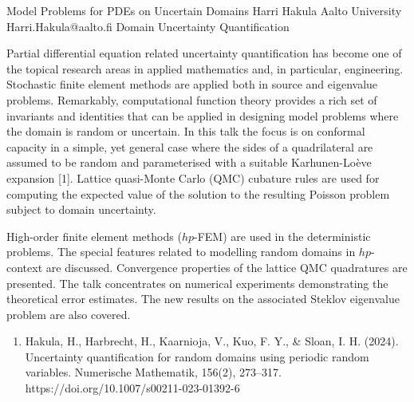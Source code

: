 \begin{talk}
  {Model Problems for PDEs on Uncertain Domains}%
  {Harri Hakula}%
  {Aalto University}%
  {Harri.Hakula@aalto.fi}%
  {}%
  {Domain Uncertainty Quantification}%
    
   
Partial differential equation related uncertainty quantification has become one of the
topical research areas in applied mathematics and, in particular, engineering.
Stochastic finite element methods are applied both in source and eigenvalue problems.
Remarkably, computational function theory provides a rich set of invariants 
and identities that
can be applied in designing model problems where the domain is random or uncertain. 
In this talk the focus is on conformal capacity in a simple, 
yet general case where the sides of a quadrilateral are assumed to be random 
and parameterised with a suitable Karhunen-Lo\`eve expansion [1].
Lattice quasi-Monte Carlo (QMC) cubature rules are used for computing the expected value of the solution to the resulting Poisson problem subject to domain uncertainty. 

High-order finite element methods ($hp$-FEM) are used in the deterministic problems.
The special features related to modelling random domains in $hp$-context are discussed.
Convergence properties of the lattice QMC quadratures are presented. The talk
concentrates on numerical experiments demonstrating the theoretical error estimates.
The new results on the associated Steklov eigenvalue problem are also covered.


\medskip

\begin{enumerate}
 \item[{[1]}] Hakula, H., Harbrecht, H., Kaarnioja, V., Kuo, F. Y., \& Sloan, I. H. (2024). Uncertainty quantification for random domains using periodic random variables. Numerische Mathematik, 156(2), 273--317. https://doi.org/10.1007/s00211-023-01392-6
\end{enumerate}

\end{talk}
